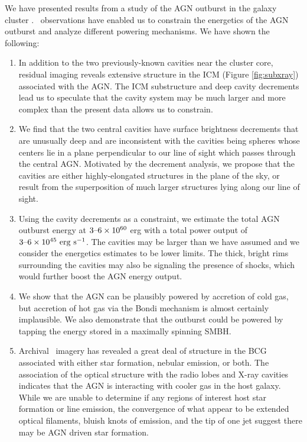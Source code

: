\documentclass[iop]{emulateapj}
\begin{document}
We have presented results from a study of the AGN outburst in the
galaxy cluster \rbs. \cxo\ observations have enabled us to constrain
the energetics of the AGN outburst and analyze different powering
mechanisms. We have shown the following:
\begin{enumerate}
\item In addition to the two previously-known cavities near the
  cluster core, residual imaging reveals extensive structure in the
  ICM (Figure \ref{fig:subxray}) associated with the AGN. The ICM
  substructure and deep cavity decrements lead us to speculate that
  the cavity system may be much larger and more complex than the
  present data allows us to constrain.
\item We find that the two central cavities have surface brightness
  decrements that are unusually deep and are inconsistent with the
  cavities being spheres whose centers lie in a plane perpendicular to
  our line of sight which passes through the central AGN. Motivated by
  the decrement analysis, we propose that the cavities are either
  highly-elongated structures in the plane of the sky, or result from
  the superposition of much larger structures lying along our line of
  sight.
\item Using the cavity decrements as a constraint, we estimate the
  total AGN outburst energy at $3 \mbox{--} 6 \times 10^{60}$ erg with a
  total power output of $3 \mbox{--} 6 \times 10^{45} ~\rm{\mbox{\ensuremath{\rm{erg}}}~\ensuremath{\rm{\mbox{\ensuremath{\rm{s}}}^{-1}}}}$. The cavities
  may be larger than we have assumed and we consider the energetics
  estimates to be lower limits. The thick, bright rims surrounding the
  cavities may also be signaling the presence of shocks, which would
  further boost the AGN energy output.
\item We show that the AGN can be plausibly powered by accretion of
  cold gas, but accretion of hot gas via the Bondi mechanism is almost
  certainly implausible. We also demonstrate that the outburst could
  be powered by tapping the energy stored in a maximally spinning
  SMBH.
\item Archival \hst\ imagery has revealed a great deal of structure in
  the BCG associated with either star formation, nebular emission, or
  both. The association of the optical structure with the radio lobes
  and X-ray cavities indicates that the AGN is interacting with cooler
  gas in the host galaxy. While we are unable to determine if any
  regions of interest host star formation or line emission, the
  convergence of what appear to be extended optical filaments, bluish
  knots of emission, and the tip of one jet suggest there may be AGN
  driven star formation.
\end{enumerate}
\end{document}
